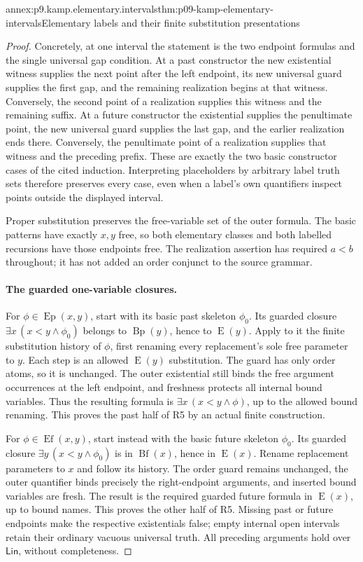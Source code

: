 \begin{annexitem}{annex:p9.kamp.elementary.intervals}{thm:p09-kamp-elementary-intervals}{Elementary labels and their finite substitution presentations}
\begin{proof}
Concretely, at one interval the statement is the two endpoint formulas
and the single universal gap condition. At a past constructor the new
existential witness supplies the next point after the left endpoint,
its new universal guard supplies the first gap, and the remaining
realization begins at that witness. Conversely, the second point of a
realization supplies this witness and the remaining suffix. At a future
constructor the existential supplies the penultimate point, the new
universal guard supplies the last gap, and the earlier realization ends
there. Conversely, the penultimate point of a realization supplies that
witness and the preceding prefix. These are exactly the two basic
constructor cases of the cited induction. Interpreting placeholders by
arbitrary label truth sets therefore preserves every case, even when a
label's own quantifiers inspect points outside the displayed interval.

Proper substitution preserves the free-variable set of the outer
formula. The basic patterns have exactly \(x,y\) free, so both
elementary classes and both labelled recursions have those endpoints
free. The realization assertion has required \(a<b\) throughout;
it has not added an order conjunct to the source grammar.

\paragraph{The guarded one-variable closures.}
For \(\phi\in\operatorname{Ep}(x,y)\), start with its basic
past skeleton \(\phi_0\). Its guarded closure
\(\exists x\,(x<y\land\phi_0)\) belongs to
\(\operatorname{Bp}(y)\), hence to \(\operatorname{E}(y)\).
Apply to it the finite substitution history of \(\phi\), first
renaming every replacement's sole free parameter to \(y\).
Each step is an allowed \(\operatorname{E}(y)\) substitution.
The guard has only order atoms, so it is unchanged. The outer existential
still binds the free argument occurrences at the left endpoint, and
freshness protects all internal bound variables. Thus the resulting
formula is \(\exists x\,(x<y\land\phi)\), up to the allowed bound
renaming. This proves the past half of R5 by an actual finite construction.

For \(\phi\in\operatorname{Ef}(x,y)\), start instead with the
basic future skeleton \(\phi_0\). Its guarded closure
\(\exists y\,(x<y\land\phi_0)\) is in
\(\operatorname{Bf}(x)\), hence in \(\operatorname{E}(x)\).
Rename replacement parameters to \(x\) and follow its history.
The order guard remains unchanged, the outer quantifier binds precisely
the right-endpoint arguments, and inserted bound variables are fresh.
The result is the required guarded future formula in
\(\operatorname{E}(x)\), up to bound names. This proves the other
half of R5. Missing past or future endpoints make the respective
existentials false; empty internal open intervals retain their ordinary
vacuous universal truth. All preceding arguments hold over
\(\mathsf{Lin}\), without completeness.
\end{proof}
\end{annexitem}

